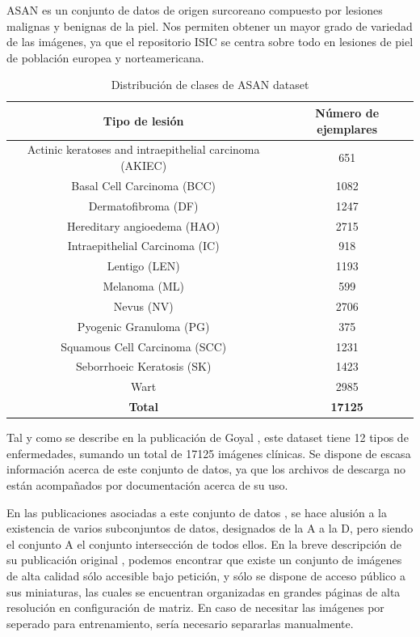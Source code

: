 ASAN \cite{Han2017,HAN20181529,HAN20189} es un conjunto de datos de origen surcoreano compuesto por lesiones malignas y benignas de la piel. Nos permiten obtener un mayor grado de variedad de las imágenes, ya que el repositorio ISIC se centra sobre todo en lesiones de piel de población europea y norteamericana.

\begin{table}[H]
	\centering
	\begin{tabular}{|c|c|}
		\hline
		\textbf{Tipo de lesión} & \textbf{Número de ejemplares} \\ \hline
		{Actinic keratoses and intraepithelial carcinoma (AKIEC)} & 651 \\ \hline
		{Basal Cell Carcinoma (BCC)} & 1082 \\ \hline
		{Dermatofibroma (DF)} & 1247 \\ \hline
		{Hereditary angioedema (HAO)} & 2715 \\ \hline
		{Intraepithelial Carcinoma (IC)} & 918 \\ \hline
		{Lentigo (LEN)} & 1193 \\ \hline
		{Melanoma (ML)} & 599 \\ \hline
		{Nevus (NV)} & 2706 \\ \hline
		{Pyogenic Granuloma (PG)}  & 375 \\ \hline
		{Squamous Cell Carcinoma (SCC)} & 1231 \\ \hline
		{Seborrhoeic Keratosis (SK)}  & 1423 \\ \hline
		{Wart} & 2985 \\ \hline
		\textbf{Total} & \textbf{17125} \\ \hline
	\end{tabular}
	\caption{Distribución de clases de ASAN dataset}
\end{table}

Tal y como se describe en la publicación de Goyal \cite{goyal2020artificial} , este dataset tiene 12 tipos de enfermedades, sumando un total de 17125 imágenes clínicas. Se dispone de escasa información acerca de este conjunto de datos, ya que los archivos de descarga no están acompañados por documentación acerca de su uso.


En las publicaciones asociadas a este conjunto de datos \cite{Han2017,HAN20181529,HAN20189}, se hace alusión a la existencia de varios subconjuntos de datos, designados de la A a la D, pero siendo el conjunto A el conjunto intersección de todos ellos. En la breve descripción de su publicación original \cite{Han2017}, podemos encontrar que existe un conjunto de imágenes de alta calidad sólo accesible bajo petición, y sólo se dispone de acceso público a sus miniaturas, las cuales se encuentran organizadas en grandes páginas de alta resolución en configuración de matriz. En caso de necesitar las imágenes por seperado para entrenamiento, sería necesario separarlas manualmente.

